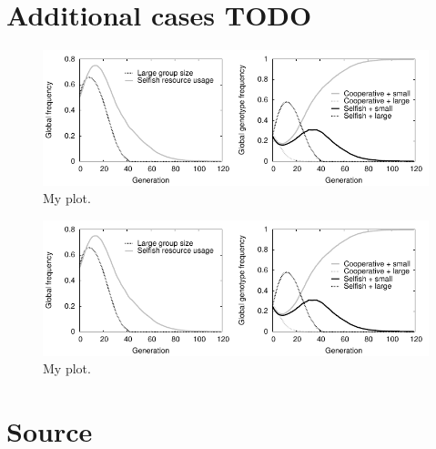\documentclass[11pt]{article}
\begin{document}

\appendix
\section{Additional cases TODO}
\begin{figure}[!ht]
  \centering
  \includegraphics{equalplot.pdf}
  \caption{My plot.}
  \label{Figure:plot}
\end{figure}

\begin{figure}[!ht]
  \centering
  \includegraphics{equalplot.pdf}
  \caption{My plot.}
  \label{Figure:plot}
\end{figure}

\section{Source}

\end{document}
